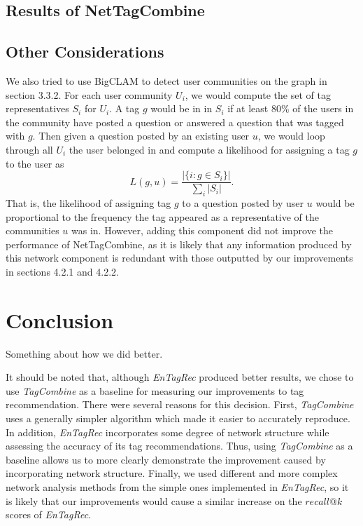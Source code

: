 \documentclass[11pt]{IEEEtran}
\begin{document}
\subsection{Results of NetTagCombine}

\subsection{Other Considerations}

We also tried to use BigCLAM to detect user communities on the graph in section 3.3.2. For each user community $U_i$, we would compute the set of tag representatives $S_i$ for $U_i$. A tag $g$ would be in in $S_i$ if at least $80\%$ of the users in the community have posted a question or answered a question that was tagged with $g$. Then given a question posted by an existing user $u$, we would loop through all $U_i$ the user belonged in and compute a likelihood for assigning a tag $g$ to the user as
\[ L(g, u) = \frac{|\{i : g \in S_i\} |}{\sum_i |S_i|}. \]
That is, the likelihood of assigning tag $g$ to a question posted by user $u$ would be proportional to the frequency the tag appeared as a representative of the communities $u$ was in. However, adding this component did not improve the performance of NetTagCombine, as it is likely that any information produced by this network component is redundant with those outputted by our improvements in sections 4.2.1 and 4.2.2.

\section{Conclusion}

Something about how we did better.

It should be noted that, although \textit{EnTagRec} produced better results, we chose to use \textit{TagCombine} as a baseline for measuring our improvements to tag recommendation. There were several reasons for this decision. First, \textit{TagCombine} uses a generally simpler algorithm which made it easier to accurately reproduce. In addition, \textit{EnTagRec} incorporates some degree of network structure while assessing the accuracy of its tag recommendations. Thus, using \textit{TagCombine} as a baseline allows us to more clearly demonstrate the improvement caused by incorporating network structure. Finally, we used different and more complex network analysis methods from the simple ones implemented in \textit{EnTagRec}, so it is likely that our improvements would cause a similar increase on the $recall@k$ scores of \textit{EnTagRec}.
\end{document}
